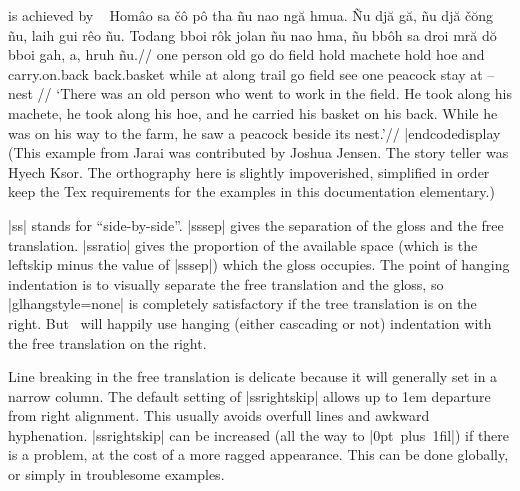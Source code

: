 \noindent is achieved by
\codedisplay~
\ex[glftpos=right,glhangstyle=none]
\let\\=\smallcaps
\begingl
\gla
Hom\^{a}o sa \v{c}\^{o} p\^{o} tha  \~{n}u nao ng\u{a} hmua. \~{N}u
dj\u{a} g\u{a}, \~{n}u dj\u{a} \v{c}\u{o}ng \~{n}u, laih gui r\^{e}o
\~{n}u. Todang bboi r\^{o}k jolan \~{n}u nao hma, \~{n}u bb\^{o}h sa
droi mr\u{a} d\u{o} bboi gah, a, hruh \~{n}u.//
\glb
\\{exist} one \\{clf} person old \\{3s} go do field \\{3s} hold
machete \\{3s} hold hoe \\{3s} and carry.on.back back.basket \\{3s}
while at along trail \\{3s} go field \\{3s} see one \\{clf} peacock
stay at \\{drct} -- nest \\{3s}//
\glft
`There was an old person who went to work in the field. He took
along his machete, he took along his hoe, and he carried his
basket on his back. While he was on his way to the farm, he saw a
peacock beside its nest.'//
\endgl
\xe
|endcodedisplay
(This example from Jarai was contributed by Joshua Jensen.  The story
teller was Hyech Ksor.  The orthography here is slightly impoverished,
simplified in order keep the Tex requirements for the examples in this
documentation elementary.)

|ss| stands for ``side-by-side''. |sssep| gives the separation of the
gloss and the free translation. |ssratio| gives the proportion of the
available space (which is the leftskip minus the value of |sssep|)
which the gloss occupies. The point of hanging indentation is to
visually separate the free translation and the gloss, so
|glhangstyle=none| is completely satisfactory if the tree translation
is on the right. But \ will happily use hanging (either
cascading or not) indentation with the free translation on the right.

Line breaking in the free translation is delicate because it will
generally set in a narrow column. The default setting of |ssrightskip|
allows up to 1em departure from right alignment. This usually avoids
overfull lines and awkward hyphenation.  |ssrightskip| can be
increased (all the way to \hbox{|0pt plus 1fil|}) if there is a
problem, at the cost of a more ragged appearance.  This can be done
globally, or simply in troublesome examples.

